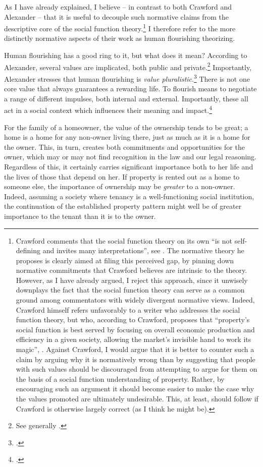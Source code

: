 \documentclass[12pt,a4paper]{book} %
\begin{document}
As I have already explained, I believe -- in contrast to both Crawford and Alexander -- that it is useful to decouple such normative claims from the descriptive core of the social function theory.\footnote{Crawford comments that the social function theory on its own  ``is not self-defining and invites many interpretations'', see \cite[1089]{crawford11}. The normative theory he proposes is clearly aimed at filing this perceived gap, by pinning down normative commitments that Crawford believes are intrinsic to the theory. However, as I have already argued, I reject this approach, since it unwisely downplays the fact that the social function theory can serve as a common ground among commentators with widely divergent normative views. Indeed, Crawford himself refers unfavorably to a writer who addresses the social function theory, but who, according to Crawford, proposes that ``property's social function is best served by focusing on overall economic production and efficiency in a given society, allowing the market's invisible hand to work its magic'', \cite[see][1089]{crawford11}. Against Crawford, I would argue that it is better to counter such a claim by arguing why it is normatively wrong than by suggesting that people with such values should be discouraged from attempting to argue for them on the basis of a social function understanding of property. Rather, by encouraging such an argument it should become easier to make the case why the values promoted are ultimately undesirable. This, at least, should follow if Crawford is otherwise largely correct (as I think he might be).} I therefore refer to the more distinctly normative aspects of their work as human flourishing theorizing. 

Human flourishing has a good ring to it, but what does it mean? According to Alexander, several values are implicated, both public and private.\footnote{See generally \cite{alexander14,alexander11}.} Importantly, Alexander stresses that human flourishing is {\it value pluralistic}.\footnote{\cite[750-751]{alexander09}.} There is not one core value that always guarantees a rewarding life. To flourish means to negotiate a range of different impulses, both internal and external. Importantly, these all act in a social context which influences their meaning and impact.\footcite[1035-1052]{alexander11}

For the family of a homeowner, the value of the ownership tends to be great; a home is a home for any non-owner living there, just as much as it is a home for the owner. This, in turn, creates both commitments and opportunities for the owner, which may or may not find recognition in the law and our legal reasoning. Regardless of this, it certainly carries significant importance both to her life and the lives of those that depend on her. If property is rented out as a home to someone else, the importance of ownership may be {\it greater} to a non-owner. Indeed, assuming a society where tenancy is a well-functioning social institution, the continuation of the established property pattern might well be of greater importance to the tenant than it is to the owner.
\end{document}

